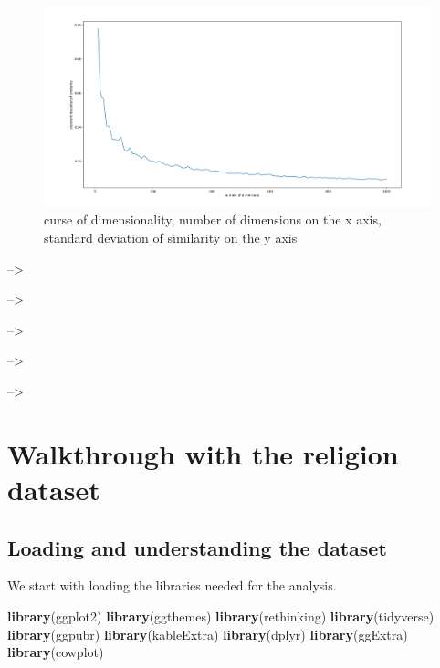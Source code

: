 \documentclass[12pt,]{book}
\newenvironment{Shaded}{\begin{snugshade}}{\end{snugshade}}
\newcommand{\KeywordTok}[1]{\textcolor[rgb]{0.13,0.29,0.53}{\textbf{#1}}}
\newcommand{\NormalTok}[1]{#1}
\begin{document}
\begin{figure}
\centering
\includegraphics{../images/curseOfDimensionality.png}
\caption{curse of dimensionality, number of dimensions on the x axis,
standard deviation of similarity on the y axis}
\end{figure}

--\textgreater{}

--\textgreater{}

--\textgreater{}

--\textgreater{}

--\textgreater{}

\chapter{Walkthrough with the religion
dataset}\label{walkthrough-with-the-religion-dataset}

\section{Loading and understanding the
dataset}\label{loading-and-understanding-the-dataset}

We start with loading the libraries needed for the analysis.

\footnotesize

\begin{Shaded}
\begin{Highlighting}[]
\KeywordTok{library}\NormalTok{(ggplot2)}
\KeywordTok{library}\NormalTok{(ggthemes)}
\KeywordTok{library}\NormalTok{(rethinking)}
\KeywordTok{library}\NormalTok{(tidyverse)}
\KeywordTok{library}\NormalTok{(ggpubr)}
\KeywordTok{library}\NormalTok{(kableExtra)}
\KeywordTok{library}\NormalTok{(dplyr)}
\KeywordTok{library}\NormalTok{(ggExtra)}
\KeywordTok{library}\NormalTok{(cowplot)}
\end{Highlighting}
\end{Shaded}
\end{document}
